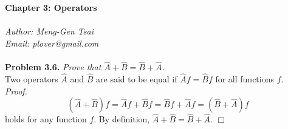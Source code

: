 \documentclass{article}
\begin{document}
\textbf{\Large Chapter 3: Operators} \\\\



\emph{Author: Meng-Gen Tsai} \\
\emph{Email: plover@gmail.com} \\\\






\textbf{Problem 3.6.}
\emph{Prove that $\hat{A} + \hat{B} = \hat{B} + \hat{A}$. } \\

Two operators $\hat{A}$ and $\hat{B}$ are said to be equal if
$\hat{A}f = \hat{B}f$ for all functions $f$. \\

\emph{Proof.}
$$(\hat{A} + \hat{B})f = \hat{A}f + \hat{B}f
= \hat{B}f + \hat{A}f = (\hat{B} + \hat{A})f$$
holds for any function $f$.
By definition,
$\hat{A} + \hat{B} = \hat{B} + \hat{A}$.
$\Box$ \\\\



\end{document}
